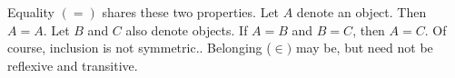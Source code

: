 

Equality $(=)$ shares these two properties.
Let $A$ denote an object.
Then $A = A$.
Let $B$ and $C$ also denote objects.
If $A = B$ and $B = C$, then $A = C$.
Of course, inclusion is not symmetric..
Belonging ($\in)$ may be, but need not be reflexive and transitive.

